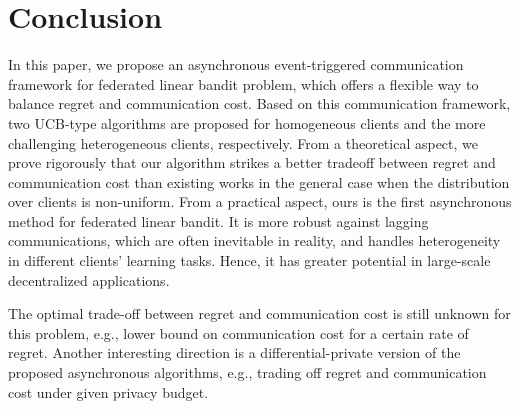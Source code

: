 \documentclass[twoside,10pt]{article}
\begin{document}
\section{Conclusion}
In this paper, we propose an asynchronous event-triggered communication framework for federated linear bandit problem, which offers a flexible way to balance regret and communication cost. 
Based on this communication framework, two UCB-type algorithms are proposed for homogeneous clients and the more challenging heterogeneous clients, respectively.
From a theoretical aspect, we prove rigorously that our algorithm strikes a better tradeoff between regret and communication cost than existing works in the general case when the distribution over clients is non-uniform. From a practical aspect, 
ours is the first asynchronous method for federated linear bandit. It is more robust against lagging communications, which are often inevitable in reality, and handles heterogeneity in different clients' learning tasks. Hence, it has greater potential in large-scale decentralized applications.

The optimal trade-off between regret and communication cost is still unknown for this problem, e.g., lower bound on communication cost for a certain rate of regret.
Another interesting direction is a differential-private version of the proposed asynchronous algorithms, e.g., trading off regret and communication cost under given privacy budget. 

% 



\end{document}
